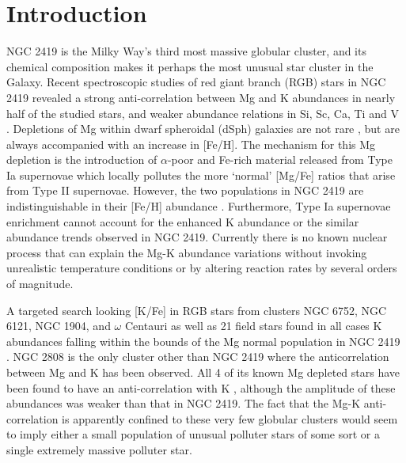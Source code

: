 \documentclass[a4paper,fleqn,usenatbib]{mnras}
\newcommand{\todo}[1]{\textcolor{red}{#1}}
\begin{document}


\section{Introduction}

NGC 2419 is the Milky Way's third most massive globular cluster, and its chemical composition makes it perhaps the most unusual star cluster in the Galaxy. Recent spectroscopic studies of red giant branch (RGB) stars in NGC 2419 revealed a strong anti-correlation between Mg and K abundances in nearly half of the studied stars, and weaker abundance relations in Si, Sc, Ca, Ti and V \citep{mucciarelli2012,cohenkirby2012}. Depletions of Mg within dwarf spheroidal (dSph) galaxies are not rare \citep{mucciarelli2012}, but are always accompanied with an increase in [Fe/H].
The mechanism for this Mg depletion is the introduction of $\alpha$-poor and Fe-rich material released from Type Ia supernovae \citep{tsujimoto2012first} which locally pollutes the more `normal' [Mg/Fe] ratios that arise from Type II supernovae. However, the two populations in NGC 2419 are indistinguishable in their [Fe/H] abundance \citep{cohenkirby2012}. Furthermore, Type Ia supernovae enrichment cannot account for the enhanced K abundance or the similar  abundance trends observed in NGC 2419. Currently there is no known nuclear process that can explain the Mg-K abundance variations  without invoking unrealistic temperature conditions or by altering reaction rates by several orders of magnitude. 





A  targeted search looking [K/Fe] in RGB stars from clusters NGC 6752, NGC 6121, NGC 1904, and $\omega$ Centauri as well as 21 field stars 
 found in all cases K abundances falling within the bounds of the Mg normal population in NGC 2419 \citep{carretta2013}.
NGC 2808 is the only cluster other than NGC 2419 where the anticorrelation between Mg and K has been observed. All 4 of its known Mg depleted stars have been found to have an anti-correlation with K \citep{mucciarelli2015}, although the amplitude of these abundances was weaker than that in NGC 2419. The fact that the Mg-K anti-correlation is apparently confined to these very few globular clusters would seem to imply either a small population  of unusual polluter stars of some sort or a single extremely massive polluter star.
\end{document}
